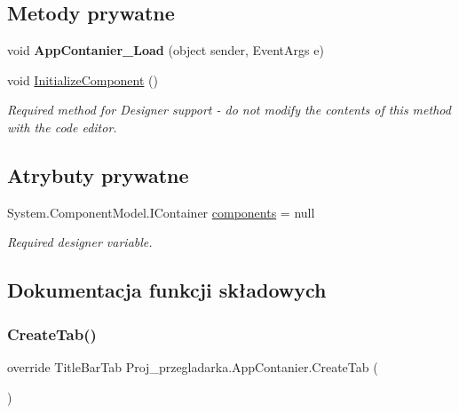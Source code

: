 \subsection*{Metody prywatne}
\begin{DoxyCompactItemize}
\item 
\mbox{\label{class_proj__przegladarka_1_1_app_contanier_a5b771b714a0e3745f45edcb74f6c14d9}} 
void {\bfseries App\+Contanier\+\_\+\+Load} (object sender, Event\+Args e)
\item 
void \mbox{\hyperlink{class_proj__przegladarka_1_1_app_contanier_a40f68d77f8a7d5b60d939ab0cc7a7274}{Initialize\+Component}} ()
\begin{DoxyCompactList}\small\item\em Required method for Designer support -\/ do not modify the contents of this method with the code editor. \end{DoxyCompactList}\end{DoxyCompactItemize}
\subsection*{Atrybuty prywatne}
\begin{DoxyCompactItemize}
\item 
System.\+Component\+Model.\+I\+Container \mbox{\hyperlink{class_proj__przegladarka_1_1_app_contanier_a9a97b5b41b1084b2642d76c95620566f}{components}} = null
\begin{DoxyCompactList}\small\item\em Required designer variable. \end{DoxyCompactList}\end{DoxyCompactItemize}


\subsection{Dokumentacja funkcji składowych}
\mbox{\label{class_proj__przegladarka_1_1_app_contanier_ab11a413a1a0d9bf970f8e9c1e124fbce}} 
\subsubsection{\texorpdfstring{CreateTab()}{CreateTab()}}
{\footnotesize\ttfamily override Title\+Bar\+Tab Proj\+\_\+przegladarka.\+App\+Contanier.\+Create\+Tab (\begin{DoxyParamCaption}{ }\end{DoxyParamCaption})}



